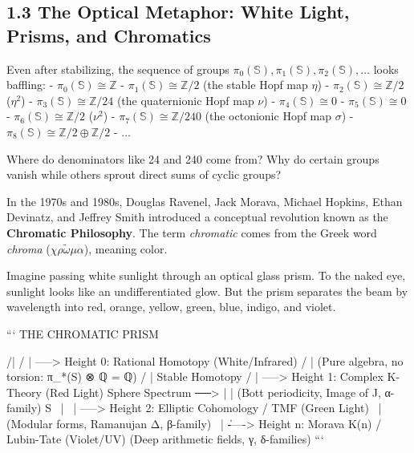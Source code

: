 \documentclass[11pt,twoside,openright]{amsbook}
\begin{document}
{{\subsection{1.3 The Optical Metaphor: White Light, Prisms, and Chromatics}
Even after stabilizing, the sequence of groups $\pi_0(\mathbb{S}), \pi_1(\mathbb{S}), \pi_2(\mathbb{S}), \dots$ looks baffling:
- $\pi_0(\mathbb{S}) \cong \mathbb{Z}$
- $\pi_1(\mathbb{S}) \cong \mathbb{Z}/2$ (the stable Hopf map $\eta$)
- $\pi_2(\mathbb{S}) \cong \mathbb{Z}/2$ ($\eta^2$)
- $\pi_3(\mathbb{S}) \cong \mathbb{Z}/24$ (the quaternionic Hopf map $\nu$)
- $\pi_4(\mathbb{S}) \cong 0$
- $\pi_5(\mathbb{S}) \cong 0$
- $\pi_6(\mathbb{S}) \cong \mathbb{Z}/2$ ($\nu^2$)
- $\pi_7(\mathbb{S}) \cong \mathbb{Z}/240$ (the octonionic Hopf map $\sigma$)
- $\pi_8(\mathbb{S}) \cong \mathbb{Z}/2 \oplus \mathbb{Z}/2$
- $\dots$

Where do denominators like 24 and 240 come from? Why do certain groups vanish while others sprout direct sums of cyclic groups?

In the 1970s and 1980s, Douglas Ravenel, Jack Morava, Michael Hopkins, Ethan Devinatz, and Jeffrey Smith introduced a conceptual revolution known as the \textbf{Chromatic Philosophy}. The term \textit{chromatic} comes from the Greek word \textit{chroma} ($\chi\rho\tilde{\omega}\mu\alpha$), meaning color.

Imagine passing white sunlight through an optical glass prism. To the naked eye, sunlight looks like an undifferentiated glow. But the prism separates the beam by wavelength into red, orange, yellow, green, blue, indigo, and violet.

```
                         THE CHROMATIC PRISM
                         
                           /|
                          / |   -----> Height 0: Rational Homotopy (White/Infrared)
                         /  |          (Pure algebra, no torsion: π_*(S) ⊗ ℚ = ℚ)
                        /   |
   Stable Homotopy     /    |   -----> Height 1: Complex K-Theory (Red Light)
   Sphere Spectrum ──> |    |          (Bott periodicity, Image of J, α-family)
         S             \    |
                        \   |   -----> Height 2: Elliptic Cohomology / TMF (Green Light)
                         \  |          (Modular forms, Ramanujan Δ, β-family)
                          \ |
                           \|   -----> Height n: Morava K(n) / Lubin-Tate (Violet/UV)
                                       (Deep arithmetic fields, γ, δ-families)
```

}}
\end{document}
